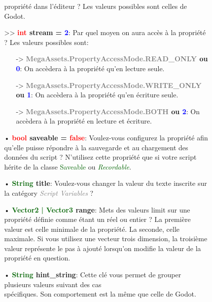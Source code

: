 \documentclass[a4paper, 11pt]{article}
\begin{document}
\begin{description}
\begin{itemize}
\begin{itemize}
				propriété dans l'éditeur ? Les valeurs possibles sont celles de Godot.\\
				\item[>> \textbf{\textcolor{red}{int} stream = \textcolor{blue}{2}}:] Par quel moyen on aura
				accès à la propriété ? Les valeurs possibles sont:
				\begin{itemize}
					\item [-> \textbf{\textcolor{gray}{MegaAssets.PropertyAccessMode.READ\_ONLY} ou
					\textcolor{blue}{0}}:] On accèdera à la propriété qu'en lecture seule.
					\item [-> \textbf{\textcolor{gray}{MegaAssets.PropertyAccessMode.WRITE\_ONLY} ou
					\textcolor{blue}{1}}:] On accèdera à la propriété qu'en écriture seule.
					\item [-> \textbf{\textcolor{gray}{MegaAssets.PropertyAccessMode.BOTH} ou
					\textcolor{blue}{2}}:] On accèdera à la propriété en lecture et écriture.\\
				\end{itemize}
				\item[• \textbf{\textcolor{red}{bool} saveable = \textcolor{red}{false}}:] Voulez-vous
				configurez la propriété afin qu'elle puisse répondre à la sauvegarde et au chargement des
				données du script ? N'utilisez cette propriété que si votre script hérite de la classe
				\textcolor {darkgreen}{Saveable} ou \textit{\textcolor {darkgreen}{Recordable}}.\\
				\item[• \textbf{\textcolor{darkgreen}{String} title}:] Voulez-vous changer la valeur du 
		    	texte inscrite sur la catégory \textit{\textcolor {gray}{Script Variables}} ?\\
		    	\item[• \textbf{\textcolor{darkgreen}{Vector2 | Vector3} range}:] Mets des valeurs limit
		    	sur une propriété définie comme étant un réel ou entier ? La première valeur est celle 
		    	minimale de la propriété. La seconde, celle maximale. Si vous utilisez une vecteur trois 
		    	dimension, la troisième valeur représente le pas à ajouté lorsqu'on modifie la valeur de la 
		    	propriété en question.\\
		    	\item[• \textbf{\textcolor{darkgreen}{String} hint\_string}:] Cette clé vous permet de 
		    	grouper plusieurs valeurs suivant des cas \\spécifiques. Son comportement est la même que 
		    	celle de Godot.\\								

\end{itemize}
\end{itemize}
\end{description}
\end{document}
